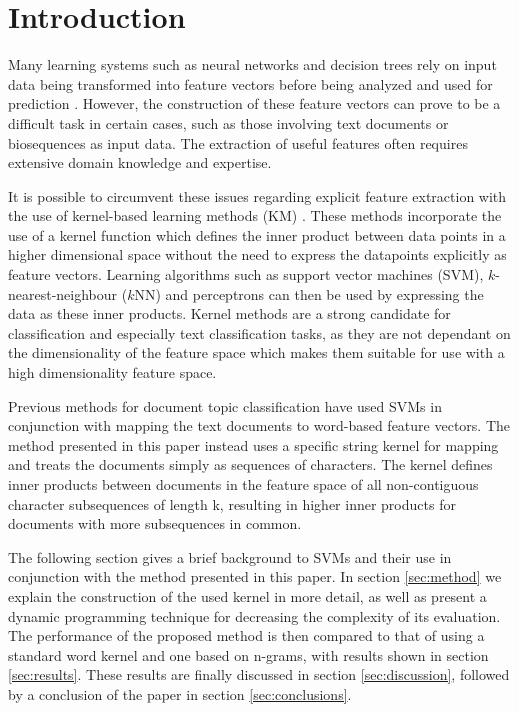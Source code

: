 \section{Introduction} \label{sec:intro}

Many learning systems such as neural networks and decision trees rely on input data being transformed into feature vectors before being analyzed and used for prediction \cite{word2vec, glove}. However, the construction of these feature vectors can prove to be a difficult task in certain cases, such as those involving text documents or biosequences as input data. The extraction of useful features often requires extensive domain knowledge and expertise.

It is possible to circumvent these issues regarding explicit feature extraction with the use of kernel-based learning methods (KM) \cite{vapnik}. These methods incorporate the use of a kernel function which defines the inner product between data points in a higher dimensional space without the need to express the datapoints explicitly as feature vectors. Learning algorithms such as support vector machines (SVM), $k$-nearest-neighbour ($k$NN) and perceptrons can then be used by expressing the data as these inner products. Kernel methods are a strong candidate for classification and especially text classification tasks, as they are not dependant on the dimensionality of the feature space which makes them suitable for use with a high dimensionality feature space.

Previous methods for document topic classification \cite{wk} have used SVMs in conjunction with mapping the text documents to word-based feature vectors. The method presented in this paper instead uses a specific string kernel for mapping and treats the documents simply as sequences of characters. The kernel defines inner products between documents in the feature space of all non-contiguous character subsequences of length k, resulting in higher inner products for documents with more subsequences in common.

The following section gives a brief background to SVMs and their use in conjunction with the method presented in this paper. In section \ref{sec:method} we explain the construction of the used kernel in more detail, as well as present a dynamic programming technique for decreasing the complexity of its evaluation. The performance of the proposed method is then compared to that of using a standard word kernel and one based on n-grams, with results shown in section \ref{sec:results}. These results are finally discussed in section \ref{sec:discussion}, followed by a conclusion of the paper in section \ref{sec:conclusions}.
